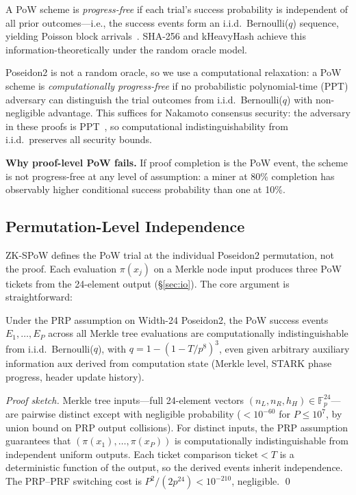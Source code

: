 \documentclass[11pt,a4paper]{article}
\begin{document}
A PoW scheme is \emph{progress-free} if each trial's success probability is independent of all prior outcomes---i.e., the success events form an i.i.d.\ Bernoulli($q$) sequence, yielding Poisson block arrivals~\cite{nakamoto}. SHA-256 and kHeavyHash achieve this information-theoretically under the random oracle model.

Poseidon2 is not a random oracle, so we use a computational relaxation: a PoW scheme is \emph{computationally progress-free} if no probabilistic polynomial-time (PPT) adversary can distinguish the trial outcomes from i.i.d.\ Bernoulli($q$) with non-negligible advantage. This suffices for Nakamoto consensus security: the adversary in these proofs is PPT~\cite{nakamoto,dagknight}, so computational indistinguishability from i.i.d.\ preserves all security bounds.

\textbf{Why proof-level PoW fails.} If proof completion is the PoW event, the scheme is not progress-free at any level of assumption: a miner at 80\% completion has observably higher conditional success probability than one at 10\%.

\subsection{Permutation-Level Independence}
\label{sec:perm-independence}

ZK-SPoW defines the PoW trial at the individual Poseidon2 permutation, not the proof. Each evaluation $\pi(x_j)$ on a Merkle node input produces three PoW tickets from the 24-element output (\S\ref{sec:io}). The core argument is straightforward:

\begin{theorem}\label{thm:progress}
Under the PRP assumption on Width-24 Poseidon2, the PoW success events $E_1, \ldots, E_P$ across all Merkle tree evaluations are computationally indistinguishable from i.i.d.\ Bernoulli($q$), with $q = 1 - (1-T/p^8)^3$, even given arbitrary auxiliary information $\mathrm{aux}$ derived from computation state (Merkle level, STARK phase progress, header update history).
\end{theorem}

\emph{Proof sketch.} Merkle tree inputs---full 24-element vectors $(n_L, n_R, h_H) \in \mathbb{F}_p^{24}$---are pairwise distinct except with negligible probability ($< 10^{-60}$ for $P \leq 10^7$, by union bound on PRP output collisions). For distinct inputs, the PRP assumption guarantees that $(\pi(x_1), \ldots, \pi(x_P))$ is computationally indistinguishable from independent uniform outputs. Each ticket comparison $\text{ticket} < T$ is a deterministic function of the output, so the derived events inherit independence. The PRP--PRF switching cost is $P^2/(2p^{24}) < 10^{-210}$, negligible. \qed
\end{document}
